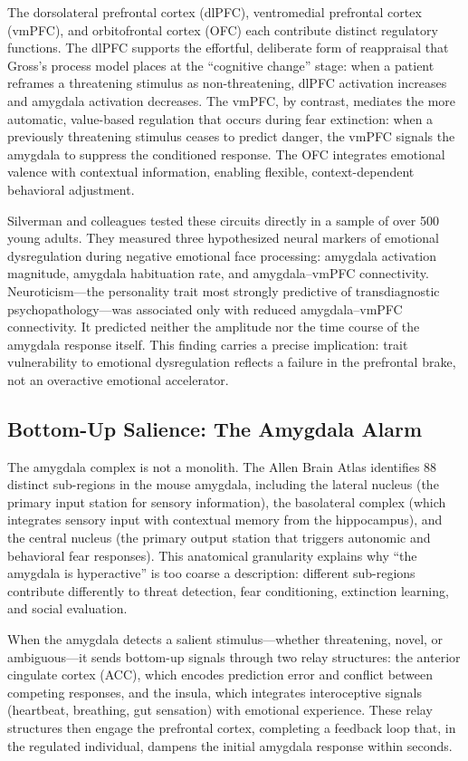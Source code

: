 The dorsolateral prefrontal cortex (dlPFC), ventromedial prefrontal cortex
(vmPFC), and orbitofrontal cortex (OFC) each contribute distinct regulatory
functions.  The dlPFC supports the effortful, deliberate form of reappraisal
that Gross's process model places at the ``cognitive change'' stage: when a
patient reframes a threatening stimulus as non-threatening, dlPFC activation
increases and amygdala activation decreases.  The vmPFC, by contrast,
mediates the more automatic, value-based regulation that occurs during fear
extinction: when a previously threatening stimulus ceases to predict danger, the
vmPFC signals the amygdala to suppress the conditioned response.  The
OFC integrates emotional valence with contextual information, enabling
flexible, context-dependent behavioral adjustment.

Silverman and colleagues tested these circuits directly in a sample of over 500
young adults.  They measured three hypothesized neural markers of
emotional dysregulation during negative emotional face processing: amygdala
activation magnitude, amygdala habituation rate, and amygdala--vmPFC
connectivity.  Neuroticism---the personality trait most strongly predictive of
transdiagnostic psychopathology---was associated only with reduced amygdala--vmPFC
connectivity.  It predicted neither the amplitude nor the time course of the
amygdala response itself.  This finding carries a precise implication: trait
vulnerability to emotional dysregulation reflects a failure in the prefrontal
brake, not an overactive emotional accelerator.

\subsection*{Bottom-Up Salience: The Amygdala Alarm}

The amygdala complex is not a monolith.  The Allen Brain Atlas identifies 88
distinct sub-regions in the mouse amygdala, including the lateral nucleus
(the primary input station for sensory information), the basolateral complex
(which integrates sensory input with contextual memory from the hippocampus),
and the central nucleus (the primary output station that triggers autonomic
and behavioral fear responses).  This anatomical granularity explains
why ``the amygdala is hyperactive'' is too coarse a description: different
sub-regions contribute differently to threat detection, fear conditioning,
extinction learning, and social evaluation.

When the amygdala detects a salient stimulus---whether threatening, novel, or
ambiguous---it sends bottom-up signals through two relay structures: the anterior
cingulate cortex (ACC), which encodes prediction error and conflict between
competing responses, and the insula, which integrates interoceptive signals
(heartbeat, breathing, gut sensation) with emotional experience.  These
relay structures then engage the prefrontal cortex, completing a feedback loop
that, in the regulated individual, dampens the initial amygdala response within
seconds.

